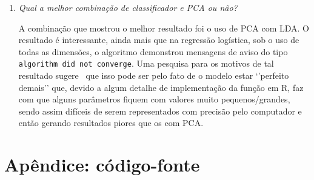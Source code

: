 \documentclass[10pt]{article}
\newcommand{\tit}[1]{\textit{#1}}
\newcommand{\ttt}[1]{\texttt{#1}}
\begin{document}
\begin{enumerate}
	\item \tit{Qual a melhor combinação de classificador e PCA ou não?}
	
	A combinação que mostrou o melhor resultado foi o uso de PCA com LDA\@.
	O resultado é interessante, ainda mais que na regressão logística, sob o 
	uso de todas as dimensões, o algoritmo demonstrou mensagens de aviso do
	tipo \ttt{algorithm did not converge}. 
	Uma pesquisa para os motivos de tal resultado sugere~\cite{cvg} que isso
	pode ser pelo fato de o modelo estar `'perfeito demais'' que, devido
	a algum detalhe de implementação da função em R, faz com que alguns 
	parâmetros fiquem com valores muito pequenos/grandes, sendo assim difíceis
	de serem representados com precisão pelo computador e então gerando
	resultados piores que os com PCA\@.
\end{enumerate}

\section{Apêndice: código-fonte}
\label{apdx}


\printbibliography
\end{document}

